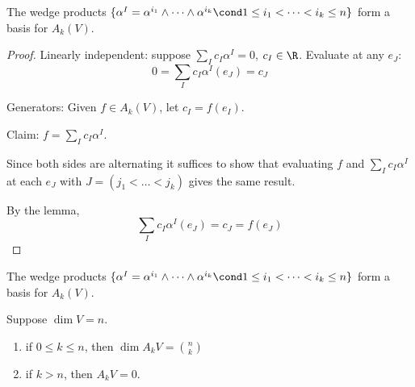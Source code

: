 \begin{frame}
  \begin{prop}
    The wedge products
    $\{
    \alpha^I = \alpha^{i_1} \wedge \dots \wedge \alpha^{i_k}
    \cond 
    1 \le i_1 < \dots < i_k \le n
    \}
    $
    form a basis for $A_k(V)$.
  \end{prop}
  \begin{proof}
    Linearly independent: suppose $\sum_I c_I \alpha^I = 0$,
    $c_I \in \R$. Evaluate at any $e_J$:
    \begin{displaymath}
      0 = \sum_I c_I \alpha^I(e_J) = c_J
    \end{displaymath}

    Generators: Given $f \in A_k(V)$, let $c_I = f(e_I)$.

    Claim: $f = \sum_I c_I \alpha^I$.

    Since both sides are alternating it suffices to show that 
    evaluating $f$ and $\sum_I c_I \alpha^I$ 
    at each $e_J$ with $J = (j_1 < \dots < j_k)$
    gives the same result.
    
    By the lemma, 
    \begin{displaymath}
      \sum_{I} c_I \alpha^I(e_J) = c_J = f(e_J)
    \end{displaymath}
  \end{proof}
\end{frame}

\begin{frame}
  \begin{prop}
    The wedge products
    $\{
    \alpha^I = \alpha^{i_1} \wedge \dots \wedge \alpha^{i_k}
    \cond 
    1 \le i_1 < \dots < i_k \le n
    \}
    $
    form a basis for $A_k(V)$.
  \end{prop}
  \begin{cor}
    Suppose $\dim V = n$.
    \begin{enumerate}
      \item if $0 \le k \le n$, then $\dim A_kV = \binom n k$
      \item if $k > n$, then $A_kV = 0$.
    \end{enumerate}
  \end{cor}
\end{frame}
